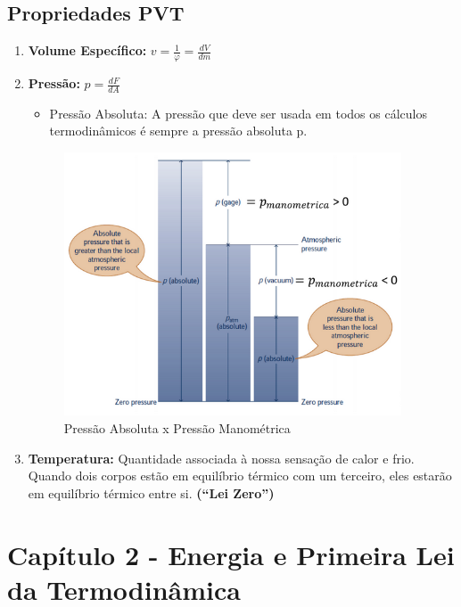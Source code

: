 \documentclass[a4paper, 12pt]{article}
\begin{document}
\subsection{Propriedades PVT}
	\begin{enumerate}
		\item \textbf{Volume Específico:} $ v = \frac{1}{\varphi} = \frac{dV}{dm} $
		\item \textbf{Pressão:} $ p = \frac{dF}{dA} $
			\begin{itemize}
				\item Pressão Absoluta: A pressão que deve ser usada em todos os cálculos termodinâmicos é sempre a pressão absoluta p.
			\end{itemize}
			\begin{figure}[h]
				\includegraphics[width=10cm]{pa.png}
				\centering
				\caption{Pressão Absoluta x Pressão Manométrica}
			\end{figure}
		\item \textbf{Temperatura:} Quantidade associada à nossa sensação de calor e frio. Quando dois corpos estão em equilíbrio térmico
		com um terceiro, eles estarão em equilíbrio térmico entre si. \textbf{(“Lei Zero”)}
	\end{enumerate}

\newpage
\section{Capítulo 2 - Energia e Primeira Lei da Termodinâmica}
\end{document}
